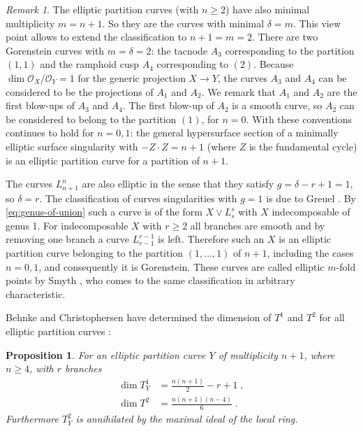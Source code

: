 \documentclass[12pt,a4paper]{amsart}  %
\newtheorem{prop}[thm]{Proposition}
\theoremstyle{definition}
\theoremstyle{remark}
\newtheorem{remark}[thm]{Remark}
\begin{document}
\begin{remark}
The elliptic partition curves (with $n\geq 2$) have also minimal multiplicity $m=n+1$.
So they are the curves with minimal $\delta=m$. 
This view point allows to extend the classification to $n+1=m=2$. There are two Gorenstein
curves with $m=\delta=2$: the tacnode $A_3$ corresponding to the partition $(1,1)$
and the ramphoid cusp $A_4$ corresponding to $(2)$. 
Because $\dim \mathcal{O}_X/\mathcal{O}_Y = 1$ for the generic projection $X\to Y$,
 the curves $A_3$ and $A_4$ can be
considered to be the projections of $A_1$ and $A_2$. We remark that $A_1$ and $A_2$
are the first blow-ups of $A_3$ and $A_4$. The first blow-up of $A_2$ is a smooth curve,
so $A_2$ can be considered to belong to the partition $(1)$, for $n=0$.
With these conventions \cite[Prop. 4.1.1]{BC} continues to hold for $n=0,1$:
the  general hypersurface section
of a minimally elliptic surface singularity with $-Z\cdot Z=n+1$ (where $Z$ is the 
fundamental cycle) is an elliptic partition curve for a partition of $n+1$.
\end{remark}

The curves $L_{n+1}^n$ are also elliptic in the sense that they satisfy
$g=\delta-r+1=1$, so $\delta=r$. The classification of curves singularities
with $g=1$ is due to Greuel \cite{Gr0,Gr}. By \eqref{eq:genus-of-union}
such a curve is of the form $X\vee L_s^s$ with $X$ indecomposable of genus 1.
For indecomposable $X$ with $r\geq 2$  all branches are smooth
and by removing one branch a curve  $L_{r-1}^{r-1}$ is left. Therefore
such an $X$ is an elliptic partition curve belonging to the partition $(1,\dots,1)$ of $n+1$,
including the cases $n=0,1$, and consequently it is Gorenstein.  
These curves are called elliptic $m$-fold points by Smyth \cite{SmI}, who comes to the
same classification in arbitrary characteristic.

Behnke and Christophersen have determined the dimension of $T^1$ and $T^2$
for all elliptic partition curves \cite[Prop. 5.4.1]{BC}:
%
\begin{prop}
 For an elliptic partition curve $Y$ of multiplicity $n + 1$, where $n\geq 4$, with $r$ branches
 \begin{align*}
\dim T^1_Y &= \frac{n(n+1)}2-r+1\;, \\
\dim T^2 &= \frac{n(n+1)(n-4)}6\;.
\end{align*}
Furthermore $T^2_Y$ is annihilated by the maximal
ideal of the local ring.
\end{prop}
\end{document}
